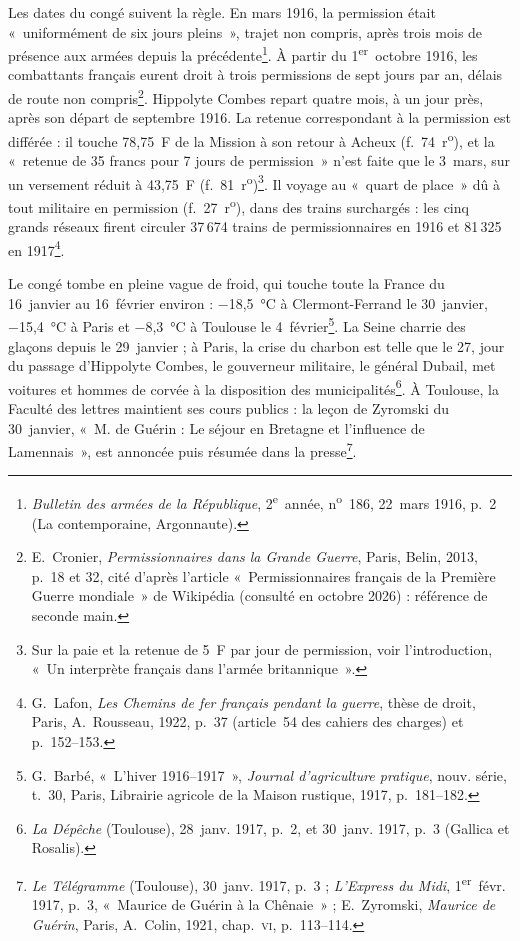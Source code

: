 Les dates du congé suivent la règle. En mars 1916, la permission était «~uniformément de six jours pleins~», trajet non compris, après trois mois de présence aux armées depuis la précédente\footnote{\textit{Bulletin des armées de la République}, 2\textsuperscript{e}~année, n\textsuperscript{o}~186, 22~mars 1916, p.~2 (La contemporaine, Argonnaute).}. À partir du 1\textsuperscript{er}~octobre 1916, les combattants français eurent droit à trois permissions de sept jours par an, délais de route non compris\footnote{E.~Cronier, \textit{Permissionnaires dans la Grande Guerre}, Paris, Belin, 2013, p.~18 et 32, cité d'après l'article «~Permissionnaires français de la Première Guerre mondiale~» de Wikipédia (consulté en octobre 2026) : référence de seconde main.}. Hippolyte Combes repart quatre mois, à un jour près, après son départ de septembre 1916. La retenue correspondant à la permission est différée : il touche 78,75~F de la Mission à son retour à Acheux (f.~74~r\textsuperscript{o}), et la «~retenue de 35 francs pour 7 jours de permission~» n'est faite que le 3~mars, sur un versement réduit à 43,75~F (f.~81~r\textsuperscript{o})\footnote{Sur la paie et la retenue de 5~F par jour de permission, voir l'introduction, «~Un interprète français dans l'armée britannique~».}. Il voyage au «~quart de place~» dû à tout militaire en permission (f.~27~r\textsuperscript{o}), dans des trains surchargés : les cinq grands réseaux firent circuler 37\,674 trains de permissionnaires en 1916 et 81\,325 en 1917\footnote{G.~Lafon, \textit{Les Chemins de fer français pendant la guerre}, thèse de droit, Paris, A.~Rousseau, 1922, p.~37 (article~54 des cahiers des charges) et p.~152--153.}.

Le congé tombe en pleine vague de froid, qui touche toute la France du 16~janvier au 16~février environ : −18,5~°C à Clermont-Ferrand le 30~janvier, −15,4~°C à Paris et −8,3~°C à Toulouse le 4~février\footnote{G.~Barbé, «~L'hiver 1916--1917~», \textit{Journal d'agriculture pratique}, nouv. série, t.~30, Paris, Librairie agricole de la Maison rustique, 1917, p.~181--182.}. La Seine charrie des glaçons depuis le 29~janvier ; à Paris, la crise du charbon est telle que le 27, jour du passage d'Hippolyte Combes, le gouverneur militaire, le général Dubail, met voitures et hommes de corvée à la disposition des municipalités\footnote{\textit{La Dépêche} (Toulouse), 28~janv. 1917, p.~2, et 30~janv. 1917, p.~3 (Gallica et Rosalis).}. À Toulouse, la Faculté des lettres maintient ses cours publics : la leçon de Zyromski du 30~janvier, «~M. de Guérin : Le séjour en Bretagne et l'influence de Lamennais~», est annoncée puis résumée dans la presse\footnote{\textit{Le Télégramme} (Toulouse), 30~janv. 1917, p.~3 ; \textit{L'Express du Midi}, 1\textsuperscript{er}~févr. 1917, p.~3, «~Maurice de Guérin à la Chênaie~» ; E.~Zyromski, \textit{Maurice de Guérin}, Paris, A.~Colin, 1921, chap.~\textsc{vi}, p.~113--114.}.

